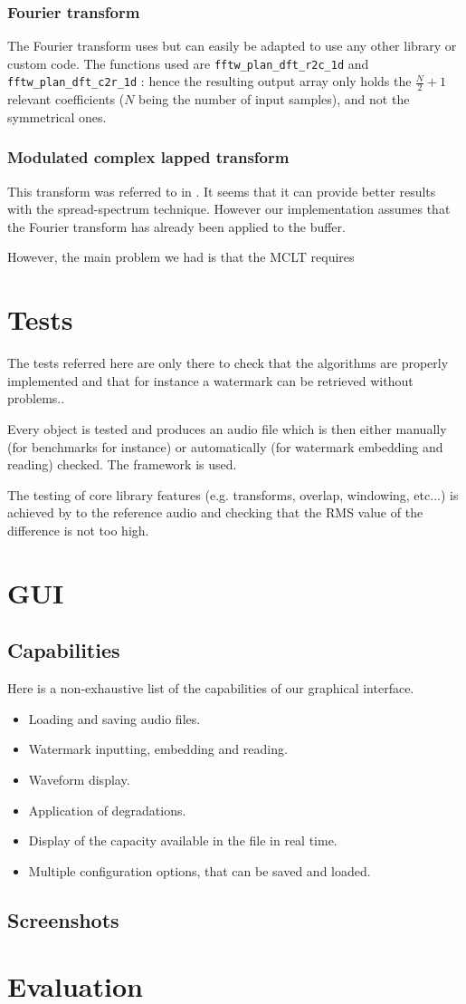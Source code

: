 \subsubsection{Fourier transform}
The Fourier transform uses  but can easily be adapted to use any other library or custom code.
The functions used are \texttt{fftw\_plan\_dft\_r2c\_1d} and \texttt{fftw\_plan\_dft\_c2r\_1d} : hence the resulting output array 
only holds the $\frac{N}{2} + 1$ relevant coefficients ($N$ being the number of input samples), and not the symmetrical ones.

\subsubsection{Modulated complex lapped transform}
This transform was referred to in \cite{malvar1999modulated}. It seems that it can provide better results with the spread-spectrum technique. However our implementation assumes that the Fourier transform has already been applied to the buffer.

However, the main problem we had is that the MCLT requires 

\section{Tests}
The tests referred here are only there to check that the algorithms are properly implemented and that for instance a watermark can be retrieved without problems..

Every object is tested and produces an audio file which is then either manually (for benchmarks for instance) or automatically (for watermark embedding and reading) checked. The  framework is used.

The testing of core library features (e.g. transforms, overlap, windowing, etc...) is achieved by  to the reference audio and checking that the RMS value of the difference is not too high.
\section{GUI}
\subsection{Capabilities}
Here is a non-exhaustive list of the capabilities of our graphical interface.
\begin{itemize}
\item Loading and saving audio files.
\item Watermark inputting, embedding and reading.
\item Waveform display.
\item Application of degradations.
\item Display of the capacity available in the file in real time.
\item Multiple configuration options, that can be saved and loaded.
\end{itemize}
\subsection{Screenshots}
\section{Evaluation}
